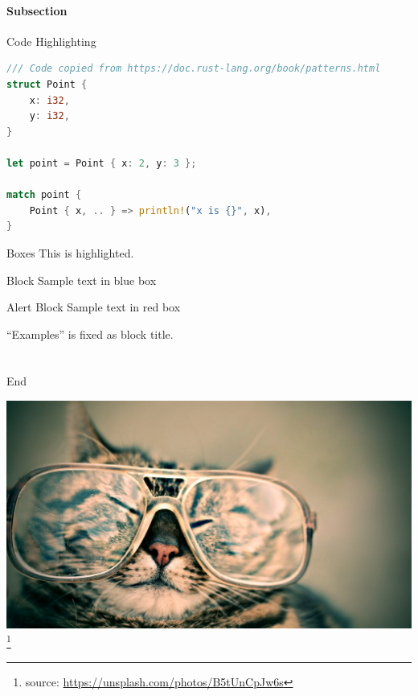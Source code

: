 \subsection{Subsection}
\begin{frame}[fragile]{Code Highlighting}
  \begin{lstlisting}[language=Rust]
/// Code copied from https://doc.rust-lang.org/book/patterns.html
struct Point {
    x: i32,
    y: i32,
}

let point = Point { x: 2, y: 3 };

match point {
    Point { x, .. } => println!("x is {}", x),
}
  \end{lstlisting}
\end{frame}


\begin{frame}{Boxes}
This is \alert{highlighted}.
\begin{block}{Block}
Sample text in blue box
\end{block}
\begin{alertblock}{Alert Block}
Sample text in red box
\end{alertblock}
\begin{examples}
``Examples'' is fixed as block title.
\end{examples}
\end{frame}

\part{} %
\begin{frame}{End}
  \begin{center}
    \includegraphics[height=.7\textheight]{images/octavio-fossatti-37556.eps}
    \footnote[frame]{source:
    \href{https://unsplash.com/photos/B5tUnCpJw6s}
    {https://unsplash.com/photos/B5tUnCpJw6s}}
  \end{center}
\end{frame}


\appendix

